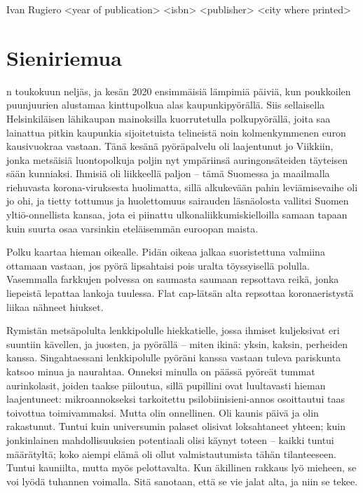 \documentclass{tsnovel}
\begin{document}
        {Ivan Rugiero}
        {<year of publication>}
        {<isbn>}
        {<publisher>}
        {<city where printed>}

\chapter{Sieniriemua}

n toukokuun neljäs, ja kesän 2020 ensimmäisiä lämpimiä päiviä, kun poukkoilen puunjuurien alustamaa kinttupolkua alas kaupunkipyörällä. Siis sellaisella Helsinkiläisen lähikaupan mainoksilla kuorrutetulla polkupyörällä, joita saa lainattua pitkin kaupunkia sijoitetuista telineistä noin kolmenkymmenen euron kausivuokraa vastaan. Tänä kesänä pyöräpalvelu oli laajentunut jo Viikkiin, jonka metsäisiä luontopolkuja poljin nyt ympäriinsä auringonsäteiden täyteisen sään kunniaksi. Ihmisiä oli liikkeellä paljon – tämä Suomessa ja maailmalla riehuvasta korona-viruksesta huolimatta, sillä alkukevään pahin leviämisevaihe oli jo ohi, ja tietty tottumus ja huolettomuus  sairauden läsnäolosta vallitsi Suomen yltiö-onnellista kansaa, jota ei piinattu ulkonaliikkumiskielloilla samaan tapaan kuin suurta osaa varsinkin eteläisemmän euroopan maista.

Polku kaartaa hieman oikealle. Pidän oikeaa jalkaa suoristettuna valmiina ottamaan vastaan, jos pyörä lipsahtaisi pois uralta töyssyisellä polulla. Vasemmalla farkkujen polvessa on saumasta saumaan repsottava reikä, jonka liepeistä lepattaa lankoja tuulessa. Flat cap-lätsän alta repsottaa koronaeristystä liikaa nähneet hiukset.

Rymistän metsäpolulta lenkkipolulle hiekkatielle, jossa ihmiset kuljeksivat eri suuntiin  kävellen, ja juosten, ja pyörällä – miten ikinä: yksin, kaksin, perheiden kanssa. Singahtaessani lenkkipolulle pyöräni kanssa vastaan tuleva pariskunta katsoo minua ja naurahtaa. Onneksi minulla on päässä pyöreät tummat aurinkolasit, joiden taakse piiloutua, sillä pupillini ovat luultavasti hieman laajentuneet:  mikroannokseksi tarkoitettu psilobiinisieni-annos osoittautui taas toivottua toimivammaksi. Mutta olin onnellinen. Oli kaunis päivä ja olin rakastunut. Tuntui kuin universumin palaset olisivat loksahtaneet yhteen; kuin jonkinlainen mahdollisuuksien potentiaali olisi käynyt toteen – kaikki tuntui määrätyltä; koko aiempi elämä oli ollut valmistautumista tähän tilanteeseen. Tuntui kauniilta, mutta myös pelottavalta. Kun äkillinen rakkaus lyö mieheen, se voi lyödä tuhannen voimalla.  Sitä sanotaan, että se vie jalat alta, ja niin se tekee.
\end{document}
